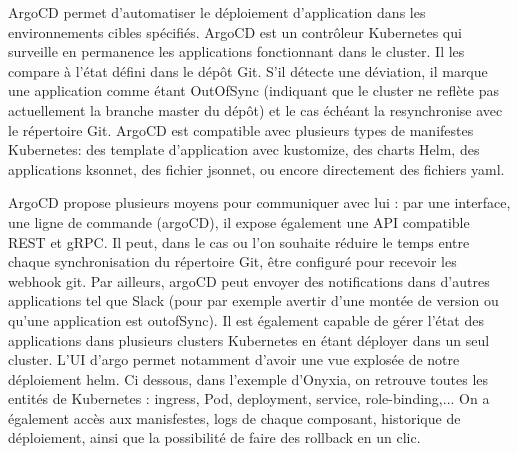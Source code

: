 \documentclass[11pt,fleqn]{book} %
\begin{document}
ArgoCD permet d'automatiser le déploiement d'application dans les environnements cibles spécifiés. ArgoCD est un contrôleur Kubernetes qui surveille en permanence les applications fonctionnant dans le cluster. Il les compare à l'état défini dans le dépôt Git. S'il détecte une déviation, il marque une application comme étant OutOfSync (indiquant que le cluster ne reflète pas actuellement la branche master du dépôt) et le cas échéant la resynchronise avec le répertoire Git.  ArgoCD est compatible avec plusieurs types de manifestes Kubernetes: des template d'application avec kustomize, des charts Helm, des applications ksonnet, des fichier jsonnet, ou encore directement des fichiers yaml.



ArgoCD propose plusieurs moyens pour communiquer avec lui : par une interface, une ligne de commande (argoCD), il expose également une API compatible REST et gRPC. Il peut, dans le cas ou l'on souhaite réduire le temps entre chaque synchronisation du répertoire Git, être configuré pour recevoir les webhook git. Par ailleurs, argoCD peut envoyer des notifications dans d'autres applications tel que Slack (pour par exemple avertir d'une montée de version ou qu'une application est outofSync). Il est également capable de gérer l'état des applications dans plusieurs clusters Kubernetes en étant déployer dans un seul cluster.
L'UI d'argo permet notamment d'avoir une vue explosée de notre déploiement helm. Ci dessous, dans l'exemple d'Onyxia, on retrouve toutes les entités de Kubernetes : ingress, Pod, deployment, service, role-binding,... On a également accès aux manisfestes, logs de chaque composant, historique de déploiement, ainsi que la possibilité de faire des rollback en un clic.
\end{document}
